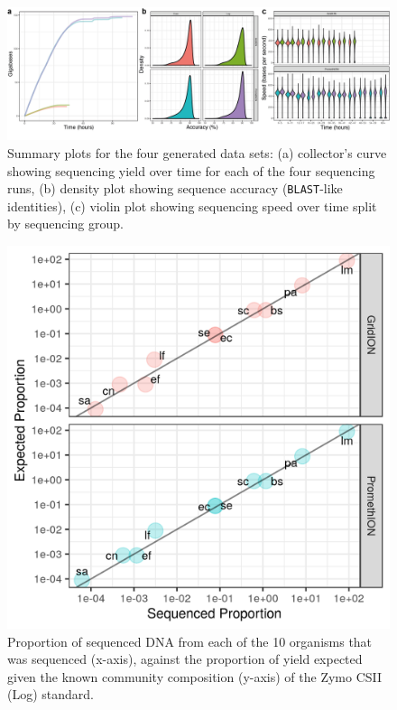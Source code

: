\documentclass[a4paper,num-refs]{oup-contemporary}
\begin{document}
\begin{figure}[t!] 
\centering
\includegraphics[width=\linewidth]{figures/Figure1.png}
\caption{
Summary plots for the four generated data sets:
(a) collector's curve showing sequencing yield over time for each of the four sequencing runs,
(b) density plot showing sequence accuracy (\texttt{BLAST}-like identities),
(c) violin plot showing sequencing speed over time split by sequencing group.
}\label{fig:summaries}
\end{figure}
\begin{figure}[b!]
\centering
\includegraphics[width=0.95\linewidth]{figures/log-ove.png}
\caption{Proportion of sequenced DNA from each of the 10 organisms that was sequenced (x-axis), against the proportion of yield expected given the known community composition (y-axis) of the Zymo CSII (Log) standard.}\label{fig:log-ove}
\end{figure}
\end{document}

